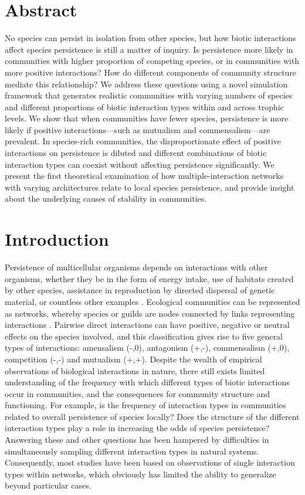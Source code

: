 \section*{Abstract}
No species can persist in isolation from other species, but how biotic interactions affect species persistence is still a matter of inquiry. Is persistence more likely in communities with higher proportion of competing species, or in communities with more positive interactions? How do different components of community structure mediate this relationship? We address these questions using a novel simulation framework that generates realistic communities with varying numbers of species and different proportions of biotic interaction types within and across trophic levels. We show that when communities have fewer species, persistence is more likely if positive interactions—such as mutualism and commensalism—are prevalent. In species-rich communities, the disproportionate effect of positive interactions on persistence is diluted and different combinations of biotic interaction types can coexist without affecting persistence significantly. We present the first theoretical examination of how multiple-interaction networks with varying architectures relate to local species persistence, and provide insight about the underlying causes of stability in communities.

\section{Introduction}

Persistence of multicellular organisms depends on interactions with other organisms, whether they be in the form of energy intake, use of habitats created by other species, assistance in reproduction by directed dispersal of genetic material, or countless other examples \citep{Bascompte2007}. Ecological communities can be represented as networks, whereby species or guilds are nodes connected by links representing interactions \citep{Proulx2005}. Pairwise direct interactions can have positive, negative or neutral effects on the species involved, and this classification gives rise to five general types of interactions: amensalism (-,0), antagonism (+,-), commensalism (+,0), competition (-,-) and mutualism (+,+). Despite the wealth of empirical observations of biological interactions in nature, there still exists limited understanding of the frequency with which different types of biotic interactions occur in communities, and the consequences for community structure and functioning. For example, is the frequency of interaction types in communities related to overall persistence of species locally? Does the structure of the different interaction types play a role in increasing the odds of species persistence? Answering these and other questions has been hampered by difficulties in simultaneously sampling different interaction types in natural systems. Consequently, most studies have been based on observations of single interaction types within networks, which obviously has limited the ability to generalize beyond particular cases.

